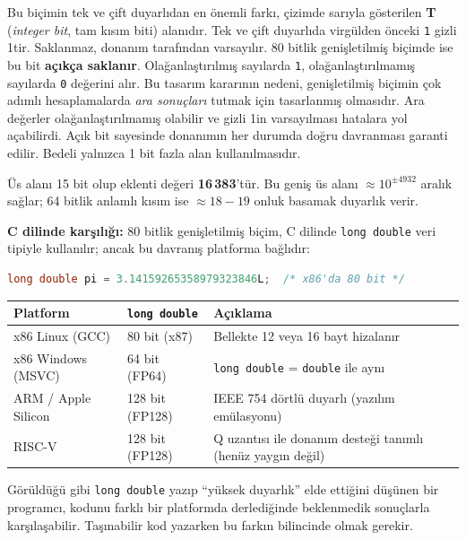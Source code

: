Bu biçimin tek ve çift duyarlıdan en önemli farkı, çizimde sarıyla gösterilen \textbf{T} (\emph{integer bit}, tam kısım biti) alanıdır. Tek ve çift duyarlıda virgülden önceki \texttt{1} gizli 1tir. Saklanmaz, donanım tarafından varsayılır. 80 bitlik genişletilmiş biçimde ise bu bit \textbf{açıkça saklanır}. Olağanlaştırılmış sayılarda \texttt{1}, olağanlaştırılmamış sayılarda \texttt{0} değerini alır. Bu tasarım kararının nedeni, genişletilmiş biçimin çok adımlı hesaplamalarda \emph{ara sonuçları} tutmak için tasarlanmış olmasıdır. Ara değerler olağanlaştırılmamış olabilir ve gizli 1in varsayılması hatalara yol açabilirdi. Açık bit sayesinde donanımın her durumda doğru davranması garanti edilir. Bedeli yalnızca 1 bit fazla alan kullanılmasıdır.

Üs alanı 15 bit olup eklenti değeri \textbf{16\,383}'tür. Bu geniş üs alanı $\approx 10^{\pm 4932}$ aralık sağlar; 64 bitlik anlamlı kısım ise $\approx 18{-}19$ onluk basamak duyarlık verir.

\textbf{C dilinde karşılığı:} 80 bitlik genişletilmiş biçim, C dilinde \texttt{long double} veri tipiyle kullanılır; ancak bu davranış platforma bağlıdır:

\begin{lstlisting}[language=C, xleftmargin=2em]
long double pi = 3.14159265358979323846L;  /* x86'da 80 bit */
\end{lstlisting}

\begin{center}
\small
\begin{tabularx}{\textwidth}{l l X}
\toprule
\textbf{Platform} & \texttt{long double} & \textbf{Açıklama} \\
\midrule
x86 Linux (GCC) & 80 bit (x87) & Bellekte 12 veya 16 bayt hizalanır \\
x86 Windows (MSVC) & 64 bit (FP64) & \texttt{long double} = \texttt{double} ile aynı \\
ARM / Apple Silicon & 128 bit (FP128) & IEEE 754 dörtlü duyarlı (yazılım emülasyonu) \\
RISC-V & 128 bit (FP128) & Q uzantısı ile donanım desteği tanımlı (henüz yaygın değil) \\
\bottomrule
\end{tabularx}
\end{center}

Görüldüğü gibi \texttt{long double} yazıp ``yüksek duyarlık'' elde ettiğini düşünen bir programcı, kodunu farklı bir platformda derlediğinde beklenmedik sonuçlarla karşılaşabilir. Taşınabilir kod yazarken bu farkın bilincinde olmak gerekir.

